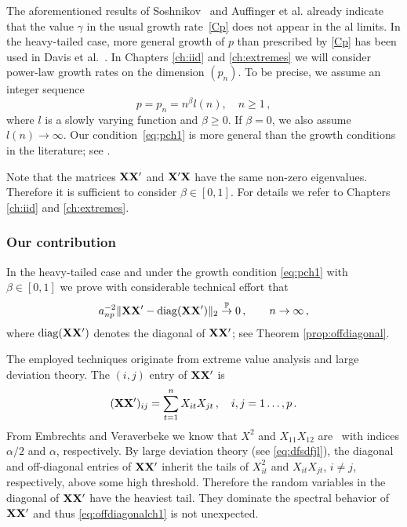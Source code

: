 The aforementioned results of Soshnikov~\cite{soshnikov:2004,soshnikov:2006} and Auffinger et al. \cite{auffinger:arous:peche:2009} already indicate that the value $\gamma$ in the usual growth
rate~\eqref{Cp} does not appear in the \ds al limits.
In the heavy-tailed case, more general growth of $p$ than prescribed by \eqref{Cp} has been used in Davis et al.~\cite{davis:mikosch:pfaffel:2015,davis:pfaffel:stelzer:2014}.
In Chapters \ref{ch:iid} and \ref{ch:extremes} we will consider power-law growth rates on the dimension $(p_n)$. To be precise, we assume an integer sequence
\begin{equation}\label{eq:pch1}
p=p_n=n^\beta l(n), \quad n\ge1\,,%
\end{equation}
where $l$ is a slowly varying function and $\beta\ge 0$. If $\beta =0$, we also assume \mbox{$l(n) \to \infty$}.
Our condition~\eqref{eq:pch1} is more general than the growth conditions in the literature; see
\cite{auffinger:arous:peche:2009,davis:mikosch:pfaffel:2015,davis:pfaffel:stelzer:2014}.

Note that the matrices ${\mathbf X}{\mathbf X}'$ and ${\mathbf X}'{\mathbf X}$ have the same non-zero eigenvalues. Therefore it is sufficient to consider $\beta\in [0,1]$. For details we refer to Chapters \ref{ch:iid} and \ref{ch:extremes}.




\subsubsection*{Our contribution}


In the heavy-tailed case and under the growth condition \eqref{eq:pch1} with $\beta \in [0,1]$ we prove with considerable technical effort that  
\begin{equation}\label{eq:offdiagonalch1}
a_{np}^{-2} \|{\mathbf X} {\mathbf X}' - \operatorname{diag}({\mathbf X} {\mathbf X}')\|_2\stackrel{\mathbb{P}}{\rightarrow} 0\,,\qquad n \to \infty\,,
\end{equation}
where $\operatorname{diag}({\mathbf X} {\mathbf X}')$ denotes the diagonal of ${\mathbf X}{\mathbf X}'$; see Theorem \ref{prop:offdiagonal}.

The employed techniques originate from extreme value analysis and large deviation theory. The $(i,j)$ entry of ${\mathbf X}{\mathbf X}'$ is 
\begin{equation*}
({\mathbf X}{\mathbf X}')_{ij}=\sum_{t=1}^n X_{it}X_{jt}\,,\quad i,j=1\ldots,p\,.
\end{equation*}
From Embrechts and Veraverbeke \cite{embrechts:veraverbeke:1982} we know that  $X^2$ and $X_{11}X_{12}$  are \regvary\ with indices $\alpha/2$ and $\alpha$, respectively. By large deviation theory (see \eqref{eq:dfsdfjl}), the diagonal and off-diagonal entries of
${\mathbf X}{\mathbf X}'$ inherit the tails of $X_{it}^2$ and $X_{it}X_{jt}$, $i\ne j$, respectively, above some high threshold. Therefore the random variables in the diagonal of ${\mathbf X}{\mathbf X}'$ have the heaviest tail. They dominate the spectral behavior of ${\mathbf X}{\mathbf X}'$ and thus \eqref{eq:offdiagonalch1} is not unexpected.
\par


